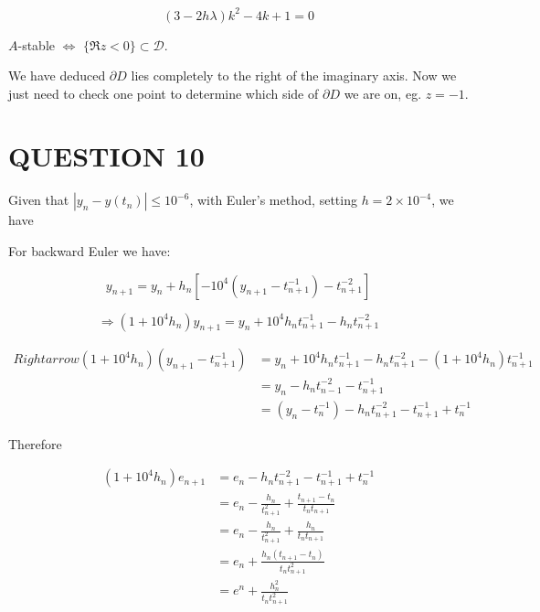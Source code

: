 \documentclass[a4paper]{article}
\begin{document}
\[ (3 - 2h \lambda)k^{2} - 4 k + 1 = 0 \]

$ A $-stable $ \iff $ $ \{ \Re z < 0 \} \subset \mathcal{D} $.

We have deduced $ \partial D $ lies completely to the right of the imaginary axis. Now we just need to check one point to determine which side of $ \partial D $ we are on, eg. $ z = -1 $. 


\section{QUESTION 10}

Given that $ | y_{n} - y(t_{n}) |  \leq  10^{-6} $, with Euler's method, setting $ h = 2 \times 10^{-4} $, we have


For backward Euler we have:

\[ y_{n+1} = y_{n} + h_{n} \left[   - 10^{4} \left( y_{n+1} - t_{n+1}^{-1} \right) - t_{n+1}^{-2} \right]  \]
                                                                                          
\[ \Rightarrow (1 + 10^{4} h_{n} ) y_{n+1} = y_{n} + 10^{4} h_{n} t_{n+1}^{-1} - h_{n} t_{n+1}^{-2}  \]

\begin{align*}
Rightarrow (1 + 10^{4} h_{n} ) (y_{n+1} - t_{n+1}^{-1} ) & = y_{n} + 10^{4} h_{n} t_{n+1}^{-1} - h_{n} t_{n+1}^{-2} - (1 + 10^{4} h_{n}) t_{n+1}^{-1} \\
& = y_{n} - h_{n} t_{n-1}^{-2} - t_{n+1}^{-1} \\
& = (y_{n} - t_{n}^{-1}) - h_{n} t_{n+1}^{-2} - t_{n+1}^{-1} + t_{n}^{-1}  
\end{align*}

Therefore 

\begin{align*}
(1 + 10^{4} h_{n} )e_{n+1} & =  e_{n} - h_{n} t_{n+1}^{-2} - t_{n+1}^{-1} + t_{n}^{-1}  \\
& = e_{n} - \frac{h_{n}}{t_{n+1}^{2}} + \frac{t_{n+1} - t_{n}}{t_{n} t_{n+1}} \\
& = e_{n} - \frac{h_{n}}{t_{n+1}^{2}} + \frac{h_{n}}{t_{n}t_{n+1}} \\
& = e_{n} + \frac{h_{n}(t_{n+1} - t_{n})}{t_{n}t_{n+1}^{2}} \\
& = e^{n} + \frac{h_{n}^{2}}{t_{n}t_{n+1}^{2}}
\end{align*}
\end{document}
